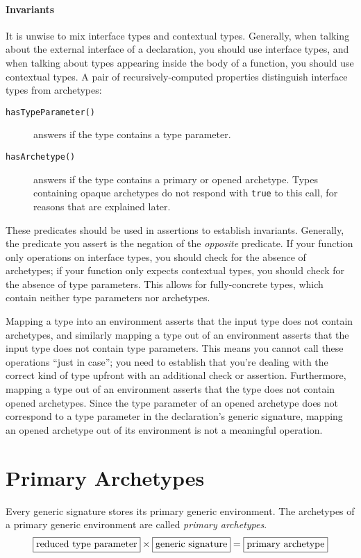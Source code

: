 \documentclass[a4paper,headsepline,bibliography=totoc,toc=flat,fleqn,twoside=semi]{scrbook}
\theoremstyle{definition}
\theoremstyle{definition}
\theoremstyle{definition}
\newcommand{\mathboxed}[1]{\boxed{\mbox{\vphantom{pI\texttt{pI}}#1}}}
\begin{document}
\paragraph{Invariants}
It is unwise to mix interface types and contextual types. Generally, when talking about the external interface of a declaration, you should use interface types, and when talking about types appearing inside the body of a function, you should use contextual types. A pair of recursively-computed properties distinguish interface types from archetypes:
\begin{description}
\item[\texttt{hasTypeParameter()}] answers if the type contains a type parameter.
\item[\texttt{hasArchetype()}] answers if the type contains a primary or opened archetype. Types containing opaque archetypes do not respond with \texttt{true} to this call, for reasons that are explained later.
\end{description}
These predicates should be used in assertions to establish invariants. Generally, the predicate you assert is the negation of the \emph{opposite} predicate. If your function only operations on interface types, you should check for the absence of archetypes; if your function only expects contextual types, you should check for the absence of type parameters. This allows for fully-concrete types, which contain neither type parameters nor archetypes.

Mapping a type into an environment asserts that the input type does not contain archetypes, and similarly mapping a type out of an environment asserts that the input type does not contain type parameters. This means you cannot call these operations ``just in case''; you need to establish that you're dealing with the correct kind of type upfront with an additional check or assertion. Furthermore, mapping a type out of an environment asserts that the type does not contain opened archetypes. Since the type parameter of an opened archetype does not correspond to a type parameter in the declaration's generic signature, mapping an opened archetype out of its environment is not a meaningful operation.

\section{Primary Archetypes}\label{archetypesubst}
Every generic signature stores its primary generic environment. The archetypes of a primary generic environment are called \emph{primary archetypes}.
\[\mathboxed{reduced type parameter}\times\mathboxed{generic signature}=\mathboxed{primary archetype}\]
\end{document}
